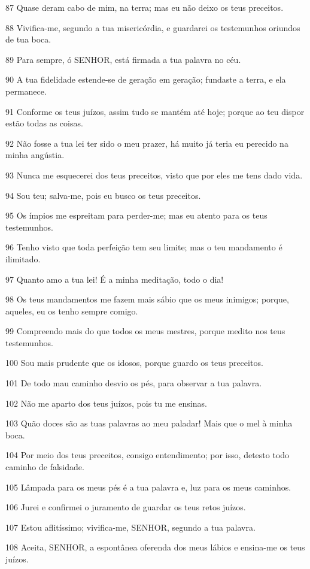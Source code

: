 \par 87 Quase deram cabo de mim, na terra; mas eu não deixo os teus preceitos.
\par 88 Vivifica-me, segundo a tua misericórdia, e guardarei os testemunhos oriundos de tua boca.
\par 89 Para sempre, ó SENHOR, está firmada a tua palavra no céu.
\par 90 A tua fidelidade estende-se de geração em geração; fundaste a terra, e ela permanece.
\par 91 Conforme os teus juízos, assim tudo se mantém até hoje; porque ao teu dispor estão todas as coisas.
\par 92 Não fosse a tua lei ter sido o meu prazer, há muito já teria eu perecido na minha angústia.
\par 93 Nunca me esquecerei dos teus preceitos, visto que por eles me tens dado vida.
\par 94 Sou teu; salva-me, pois eu busco os teus preceitos.
\par 95 Os ímpios me espreitam para perder-me; mas eu atento para os teus testemunhos.
\par 96 Tenho visto que toda perfeição tem seu limite; mas o teu mandamento é ilimitado.
\par 97 Quanto amo a tua lei! É a minha meditação, todo o dia!
\par 98 Os teus mandamentos me fazem mais sábio que os meus inimigos; porque, aqueles, eu os tenho sempre comigo.
\par 99 Compreendo mais do que todos os meus mestres, porque medito nos teus testemunhos.
\par 100 Sou mais prudente que os idosos, porque guardo os teus preceitos.
\par 101 De todo mau caminho desvio os pés, para observar a tua palavra.
\par 102 Não me aparto dos teus juízos, pois tu me ensinas.
\par 103 Quão doces são as tuas palavras ao meu paladar! Mais que o mel à minha boca.
\par 104 Por meio dos teus preceitos, consigo entendimento; por isso, detesto todo caminho de falsidade.
\par 105 Lâmpada para os meus pés é a tua palavra e, luz para os meus caminhos.
\par 106 Jurei e confirmei o juramento de guardar os teus retos juízos.
\par 107 Estou aflitíssimo; vivifica-me, SENHOR, segundo a tua palavra.
\par 108 Aceita, SENHOR, a espontânea oferenda dos meus lábios e ensina-me os teus juízos.
